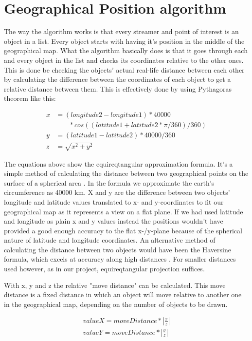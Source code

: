 \section{Geographical Position algorithm}
\label{sec:geoalgorithm}

The way the algorithm works is that every streamer and point of interest is an object in a list. Every object starts with having it's position in the middle of the geographical map. What the algorithm basically does is that it goes through each and every object in the list and checks its coordinates relative to the other ones. This is done be checking the objects' actual real-life distance between each other by calculating the difference between the coordinates of each object to get a relative distance between them. This is effectively done by using Pythagoras theorem like this:

\begin{align*}
x &= (longitude2-longitude1)*40000  \\
 &\phantom{b=\,} *cos((latitude1+latitude2 * \pi/360)/360) \nonumber \\
y &= (latitude1-latitude2)*40000/360 \\
z &= \sqrt{x^2+y^2}
\end{align*}

The equations above show the equireqtangular approximation formula. It's a simple method of calculating the distance between two geographical points on the surface of a spherical area \cite{equi}. In the formula we approximate the earth's circumference as 40000 km. X and y are the difference between two objects' longitude and latitude values translated to x- and y-coordinates to fit our geographical map as it represents a view on a flat plane. If we had used latitude and longitude as plain x and y values instead the positions wouldn't have provided a good enough accuracy to the flat x-/y-plane because of the spherical nature of latitude and longitude coordinates. An alternative method of calculating the distance between two objects would have been the Haversine formula, which excels at accuracy along high distances \cite{haversine}. For smaller distances used however, as in our project, equireqtangular projection suffices.

With x, y and z the relative "move distance" can be calculated. This move distance is a fixed distance in which an object will move relative to another one in the geographical map, depending on the number of objects to be drawn.

\begin{align*}
\label{eq:2}
valueX = moveDistance*|\frac{x}{z}| \\
valueY = moveDistance*|\frac{y}{z}|
\end{align*}

